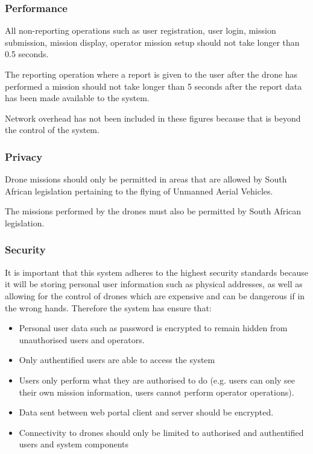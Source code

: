 \documentclass{article}
\begin{document}
			\subsubsection{Performance}
			All non-reporting operations such as user registration, user login, mission submission, mission display, operator mission setup should not take longer than 0.5 seconds.
			
			The reporting operation where a report is given to the user after the drone has performed a mission should not take longer than 5 seconds after the report data has been made available to the system.
			
			Network overhead has not been included in these figures because that is beyond the control of the system.
			
			\subsubsection{Privacy}
			Drone missions should only be permitted in areas that are allowed by South African legislation pertaining to the flying of Unmanned Aerial Vehicles.
			
			The missions performed by the drones must also be permitted by South African legislation.
			
			\subsubsection{Security}
			It is important that this system adheres to the highest security standards because it will be storing personal user information such as physical addresses, as well as allowing for the control of drones which are expensive and can be dangerous if in the wrong hands. Therefore the system has ensure that:
			\begin{itemize}
				\item Personal user data such as password is encrypted to remain hidden from unauthorised users and operators.
				\item Only authentified users are able to access the system
				\item Users only perform what they are authorised to do (e.g. users can only see their own mission information, users cannot perform operator operations).
				\item Data sent between web portal client and server should be encrypted.
				\item Connectivity to drones should only be limited to authorised and authentified users and system components
			\end{itemize}
			
\end{document}
